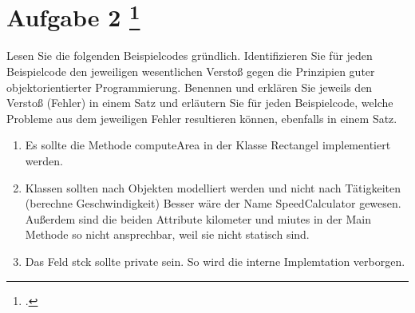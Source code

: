 \documentclass{lehramt-informatik-aufgabe}
\begin{document}
\liAufgabenTitel{}
\section{Aufgabe 2
\index{}
\footcite{66116:2021:03}}

Lesen Sie die folgenden Beispielcodes gründlich. Identifizieren Sie für
jeden Beispielcode den jeweiligen wesentlichen Verstoß gegen die
Prinzipien guter objektorientierter Programmierung. Benennen und
erklären Sie jeweils den Verstoß (Fehler) in einem Satz und erläutern
Sie für jeden Beispielcode, welche Probleme aus dem jeweiligen Fehler
resultieren können, ebenfalls in einem Satz.

\begin{enumerate}
\item {}

\begin{liAntwort}
Es sollte die Methode computeArea in der Klasse Rectangel implementiert
werden.
\end{liAntwort}

\item {}

\begin{liAntwort}
Klassen sollten nach Objekten modelliert werden und nicht nach
Tätigkeiten (berechne Geschwindigkeit) Besser wäre der Name
SpeedCalculator gewesen. Außerdem sind die beiden Attribute kilometer
und miutes in der Main Methode so nicht ansprechbar, weil sie nicht
statisch sind.
\end{liAntwort}

\item {}

\begin{liAntwort}
Das Feld stck sollte private sein. So wird die interne Implemtation
verborgen.
\end{liAntwort}
\end{enumerate}
\end{document}
